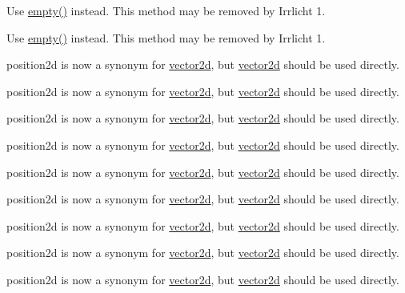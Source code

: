 
\begin{DoxyRefList}
\item[\label{deprecated__deprecated000017}%
\Hypertarget{deprecated__deprecated000017}%
Member \hyperlink{classirr_1_1core_1_1map_a2a5b309f8737e2aca9668e32c71f05ed}{irr\+:\+:core\+:\+:map$<$ Key\+Type, Value\+Type $>$\+:\+:is\+Empty} () const]Use \hyperlink{classirr_1_1core_1_1map_a253070a62165cc9881cc75bc774f7034}{empty()} instead. This method may be removed by Irrlicht 1. 

Use \hyperlink{classirr_1_1core_1_1map_a253070a62165cc9881cc75bc774f7034}{empty()} instead. This method may be removed by Irrlicht 1.  
\item[\label{deprecated__deprecated000025}%
\Hypertarget{deprecated__deprecated000025}%
Member \hyperlink{namespaceirr_1_1core_a707798aaf0a1a39bbb9d87314836e3a7}{irr\+:\+:core\+:\+:position2df} ]position2d is now a synonym for \hyperlink{classirr_1_1core_1_1vector2d}{vector2d}, but \hyperlink{classirr_1_1core_1_1vector2d}{vector2d} should be used directly. 

position2d is now a synonym for \hyperlink{classirr_1_1core_1_1vector2d}{vector2d}, but \hyperlink{classirr_1_1core_1_1vector2d}{vector2d} should be used directly. 

position2d is now a synonym for \hyperlink{classirr_1_1core_1_1vector2d}{vector2d}, but \hyperlink{classirr_1_1core_1_1vector2d}{vector2d} should be used directly. 

position2d is now a synonym for \hyperlink{classirr_1_1core_1_1vector2d}{vector2d}, but \hyperlink{classirr_1_1core_1_1vector2d}{vector2d} should be used directly. 

position2d is now a synonym for \hyperlink{classirr_1_1core_1_1vector2d}{vector2d}, but \hyperlink{classirr_1_1core_1_1vector2d}{vector2d} should be used directly. 

position2d is now a synonym for \hyperlink{classirr_1_1core_1_1vector2d}{vector2d}, but \hyperlink{classirr_1_1core_1_1vector2d}{vector2d} should be used directly. 

position2d is now a synonym for \hyperlink{classirr_1_1core_1_1vector2d}{vector2d}, but \hyperlink{classirr_1_1core_1_1vector2d}{vector2d} should be used directly. 

position2d is now a synonym for \hyperlink{classirr_1_1core_1_1vector2d}{vector2d}, but \hyperlink{classirr_1_1core_1_1vector2d}{vector2d} should be used directly. 

position2d is now a synonym for \hyperlink{classirr_1_1core_1_1vector2d}{vector2d}, but \hyperlink{classirr_1_1core_1_1vector2d}{vector2d} should be used directly. 


\end{DoxyRefList}
